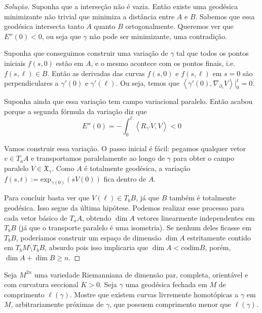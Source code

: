 \begin{proof}[Solução]
Suponha que a interseção não é vazia. Então
existe uma geodésica minimizante não
trivial que minimiza a distância entre $A$ e
$B$. Sabemos que essa geodésica
intersecta tanto $A$ quanto $B$
ortogonalmente. Queremos ver que $E''(0)<0$,
ou
seja que $\gamma$ não pode ser minimizante,
uma contradição.

Suponha que conseguimos construir uma
variação de $\gamma$ tal que todos os
pontos iniciais $f(s,0)$ estão em $A$, e o
mesmo acontece com os pontos finais,
i.e. $f(s,\ell) \in B$. Então as derivadas
das curvas $f(s,0)$ e $f(s,\ell)$ em
$s=0$ são perpendiculares a  $\gamma'(0)$ e
$\gamma'(\ell)$. Ou seja, temos que
$\left\langle{}\gamma'(0),\nabla_{\partial_s}
V\right\rangle{}|_{0}^\ell=0$.

Suponha ainda que essa variação tem campo
variacional paralelo. Então acabou
porque a segunda fórmula da variação diz que
\[E''(0)=-\int_0^\ell
\left\langle{}R_{\gamma'}V,V\right\rangle{}<0\]

Vamos construir essa variação. O passo
inicial é fácil: pegamos qualquer vetor
$v \in T_a A$ e transportamos paralelamente
ao longo de $\gamma$ para obter o
campo paralelo $V \in \mathfrak{X}_\gamma$.
Como $A$ é totalmente geodésica, a
variação
$f(s,t):=\text{exp}_{\gamma(0)}(sV(0))$ fica
dentro de $A$.

Para concluir basta ver que $ V(\ell) \in
T_bB$, já que $B$ também é totalmente
geodésica. Isso segue da última hipótese.
Podemos realizar esse processo para
cada vetor básico de  $T_a A$, obtendo $\dim
A$ vetores linearmente
independentes em $T_bB$ (já que o transporte
paralelo é uma isometria). Se
nenhum deles ficasse em $T_bB$, poderíamos
construir um espaço de dimensão $\dim
A$ estritamente contido em $T_b M\setminus
T_b B$, absurdo pois isso implicaria
que $\dim A< \text{codim} B$, porém, $\dim A+
\dim B \geq n$.

\end{proof}

\begin{exercise}
\label{exercise-free-homotopy-variation}
Seja $M^{2n}$ uma variedade Riemanniana de
dimensão par, completa, orientável e
com curvatura seccional $K>0$. Seja $\gamma$
uma geodésica fechada em $M$ de
comprimento $\ell(\gamma)$. Mostre que
existem curvas livremente homotópicas a
$\gamma$ em $M$, arbitrariamente próximas de
$\gamma$, que possuem comprimento
menor que $\ell(\gamma)$.
\end{exercise}

